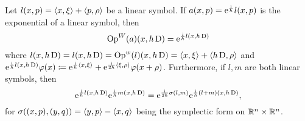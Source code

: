 \begin{nlem}
\label{lem:quant_exp_of_linear_symbol}
Let $l(x,p)=\left< x,\xi\right>+\left< p,\rho\right>$ be a linear symbol. If $a(x,p)=\mathrm{e}^{\frac{\mathrm{i}}{h}}l(x,p)$ is the exponential of a linear symbol, then 
\[
\operatorname{Op}^{W}(a)(x,h\operatorname{D})=\mathrm{e}^{\frac{\mathrm{i}}{h}l(x,h\operatorname{D})}
\]
where $l(x,h\operatorname{D})=l(x,h\operatorname{D})=\operatorname{Op}^{w}(l)(x,h\operatorname{D})=\left< x,\xi\right>+\left< h\operatorname{D},\rho\right>$ and $\mathrm{e}^{\frac{\mathrm{i}}{h}l(x,h\operatorname{D})}\varphi(x)\coloneqq\mathrm{e}^{\frac{\mathrm{i}}{h}\left< x,\xi\right>}+\mathrm{e}^{\frac{\mathrm{i}}{2h}\left< \xi,\rho\right>}\varphi(x+\rho)$. Furthermore, if $l,m$ are both linear symbols, then 
\[
\mathrm{e}^{\frac{\mathrm{i}}{h}l(x,h\operatorname{D})}\mathrm{e}^{\frac{\mathrm{i}}{h}m(x,h\operatorname{D})}=
\mathrm{e}^{\frac{\mathrm{i}}{2h}\sigma(l,m)}\mathrm{e}^{\frac{\mathrm{i}}{h}(l+m)(x,h\operatorname{D})},
\]
for $\sigma((x,p),(y,q))=\left< y,p\right>-\left< x,q\right>$ being the symplectic form on $\mathbb{R}^{n}\times\mathbb{R}^{n}$.
\end{nlem}

